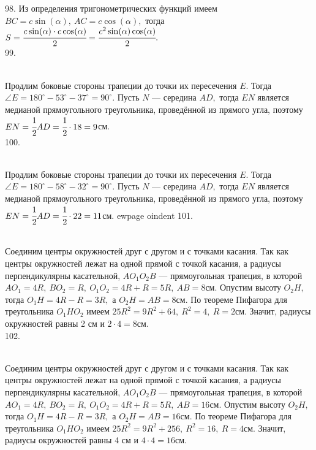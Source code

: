 98. Из определения тригонометрических функций имеем $BC=c\sin(\alpha),\ AC=c\cos(\alpha),$ тогда $S=\cfrac{c\sin(\alpha)\cdot c\cos(\alpha)}{2}=\cfrac{c^2\sin(\alpha)\cos(\alpha)}{2}.$\\
99. \begin{figure}[ht!]
\end{figure}\\
Продлим боковые стороны трапеции до точки их пересечения $E.$ Тогда $\angle E=180^\circ-53^\circ-37^\circ=90^\circ.$ Пусть $N$ --- середина $AD,$ тогда $EN$ является медианой прямоугольного треугольника, проведённой из прямого угла, поэтому $EN=\cfrac{1}{2}AD=\cfrac{1}{2}\cdot18=9$см.\\
100. \begin{figure}[ht!]
\end{figure}\\
Продлим боковые стороны трапеции до точки их пересечения $E.$ Тогда $\angle E=180^\circ-58^\circ-32^\circ=90^\circ.$ Пусть $N$ --- середина $AD,$ тогда $EN$ является медианой прямоугольного треугольника, проведённой из прямого угла, поэтому $EN=\cfrac{1}{2}AD=\cfrac{1}{2}\cdot22=11$см.
ewpage
oindent
101. \begin{figure}[ht!]
\end{figure}\\
Соединим центры окружностей друг с другом и с точками касания. Так как центры окружностей лежат на одной прямой с точкой касания, а радиусы перпендикулярны касательной, $AO_1O_2B$ --- прямоугольная трапеция, в которой $AO_1=4R,\ BO_2=R,\ O_1O_2=4R+R=5R,\ AB=8$см. Опустим высоту $O_2H,$ тогда $O_1H=4R-R=3R,$ а $O_2H=AB=8$см. По теореме Пифагора для треугольника $O_1HO_2$ имеем $25R^2=9R^2+64,\ R^2=4,\ R=2$см. Значит, радиусы окружностей равны 2 см и $2\cdot4=8$см.\\
102. \begin{figure}[ht!]
\end{figure}\\
Соединим центры окружностей друг с другом и с точками касания. Так как центры окружностей лежат на одной прямой с точкой касания, а радиусы перпендикулярны касательной, $AO_1O_2B$ --- прямоугольная трапеция, в которой $AO_1=4R,\ BO_2=R,\ O_1O_2=4R+R=5R,\ AB=16$см. Опустим высоту $O_2H,$ тогда $O_1H=4R-R=3R,$ а $O_2H=AB=16$см. По теореме Пифагора для треугольника $O_1HO_2$ имеем $25R^2=9R^2+256,\ R^2=16,\ R=4$см. Значит, радиусы окружностей равны 4 см и $4\cdot4=16$см.\\
